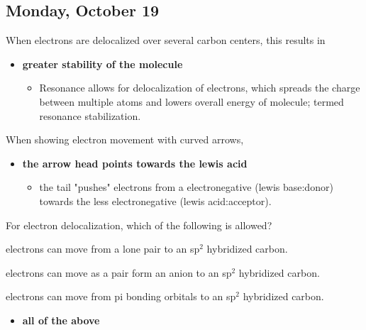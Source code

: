 \documentclass[12pt,a4paper]{article}
\begin{document}
\newpage
{}
\subsection{Monday, October 19}
\begin{enumerate}
    {\color{G-Moon}\item When electrons are delocalized over several carbon centers, this results in}
        \begin{itemize}
            \item {\color{o-Sun}\textbf{greater stability of the molecule}}
                \begin{itemize}
                    \item Resonance allows for delocalization of electrons, which spreads the charge between multiple atoms and lowers overall energy of molecule; termed {\color{o-Sun}resonance stabilization}.
                \end{itemize}
        \end{itemize}
    {\color{G-Moon}\item When showing electron movement with curved arrows,}
        \begin{itemize}
            \item {\color{o-Sun}\textbf{the arrow head points towards the lewis acid}}
                \begin{itemize}
                    \item the tail "pushes" {\color{neg}electrons} from a {\color{neg}electronegative (lewis base:donor)} towards the {\color{pos}less electronegative (lewis acid:acceptor)}. 
                \end{itemize}
        \end{itemize}
    {\color{G-Moon}\item For electron delocalization, which of the following is allowed?}
        \begin{itemize}
            {\color{G-Moon} \item electrons can move from a lone pair to an sp\(^{2}\) hybridized carbon.
            \item electrons can move as a pair form an anion to an sp\(^{2}\) hybridized carbon.
            \item electrons can move from pi bonding orbitals to an sp\(^{2}\) hybridized carbon.}
        \end{itemize}
        \begin{itemize}
            \item {\color{o-Sun}\textbf{all of the above}}

\end{itemize}
\end{enumerate}
\end{document}
